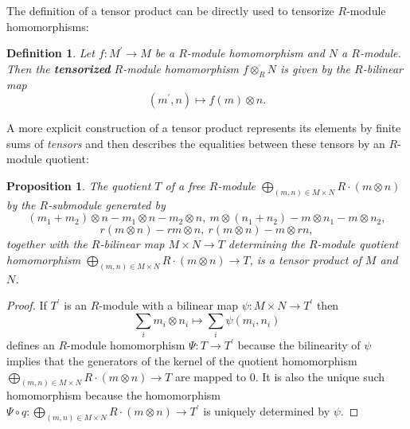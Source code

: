 \documentclass{amsart}
\theoremstyle{plain}
\numberwithin{equation}{section} %
\numberwithin{figure}{section} %
\theoremstyle{plain}
\theoremstyle{plain}
\theoremstyle{plain}
\theoremstyle{plain}
\theoremstyle{plain}
\newtheorem{prop}[thm]{Proposition} %
\theoremstyle{plain}
\newtheorem{Def}[thm]{Definition} %
\theoremstyle{remark}
\theoremstyle{remark}
\theoremstyle{remark}
\begin{document}
The definition of a tensor product can be directly used to tensorize $R$-module homomorphisms:
\begin{Def}
Let $f : M^\prime \rightarrow M$ be a $R$-module homomorphism and $N$ a $R$-module. Then the \textbf{tensorized} $R$-module homomorphism $f \otimes_R N$ is given by the $R$-bilinear map
\[ (m^\prime, n) \mapsto f(m) \otimes n. \]
\end{Def}

A more explicit construction of a tensor product represents its elements by finite sums of \textit{tensors} and then describes the equalities between these tensors by an $R$-module quotient:
\begin{prop} \label{tensor-const-prop}
The quotient $T$ of a free $R$-module $\bigoplus_{(m,n) \in M \times N} R \cdot (m \otimes n)$ by the $R$-submodule generated by 
\[ (m_1 + m_2) \otimes n - m_1 \otimes n - m_2 \otimes n,\ 
     m \otimes (n_1 + n_2) - m \otimes n_1 - m \otimes n_2,\] 
\[ r(m \otimes n) - rm \otimes n,\  r(m \otimes n) - m \otimes rn, \]
together with the $R$-bilinear map $M \times N \rightarrow T$ determining the $R$-module quotient homomorphism $\bigoplus_{(m,n) \in M \times N} R \cdot (m \otimes n) \rightarrow T$, is a tensor product of $M$ and $N$.
\end{prop}
\begin{proof}
If $T^\prime$ is an $R$-module with a bilinear map $\psi : M \times N \rightarrow T^\prime$ then
\[ \sum_i m_i \otimes n_i \mapsto \sum_i \psi(m_i, n_i) \]
defines an $R$-module homomorphism $\Psi : T \rightarrow T^\prime$ because the bilinearity of $\psi$ implies that the generators of the kernel of the quotient homomorphism $\bigoplus_{(m,n) \in M \times N} R \cdot (m \otimes n) \rightarrow T$ are mapped to $0$. It is also the unique such homomorphism because the homomorphism $\Psi \circ q: \bigoplus_{(m,n) \in M \times N} R \cdot (m \otimes n) \rightarrow T^\prime$ is uniquely determined by $\psi$.
\end{proof}
\end{document}
